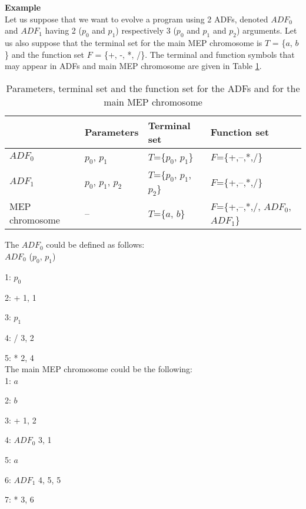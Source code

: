 \documentclass [11pt]{article}
\begin{document}
\textbf{Example}\\

Let us suppose that we want to evolve a program using 2 ADFs, denoted $ADF_0$ and $ADF_1$ having 2 ($p_{0}$ and $p_{1}$) respectively 3 ($p_{0}$ and $p_{1}$ and $p_{2}$) arguments. Let us also suppose that the terminal set for the main MEP chromosome is  $T$ = {\{}$a$, $b${\}} and the function set $F$ = {\{}+, -, *, /{\}}. The terminal and function symbols that may appear in ADFs and main MEP chromosome are given in Table \ref{table:16-5}.


\begin{table}[ht]
\begin{center}
\caption{Parameters, terminal set and the function set for the ADFs and for the main MEP chromosome}
\label{table:16-5}
\begin{tabular}
{p{75pt}p{53pt}p{70pt}p{115pt}}
\hline
& 
\textbf{Parameters}& 
\textbf{Terminal set}& 
\textbf{Function set} \\
\hline
$ADF_0$& 
$p_{0}$, $p_{1}$& 
$T$={\{}$ p_{0}$, $p_{1}${\}}& 
$F$={\{}+,--,*,/{\}} \\
$ADF_1$& 
$p_{0}$, $p_{1}$, $p_{2}$& 
$T$={\{}$p_{0}$, $p_{1}$, $p_{2}${\}}& 
$F$={\{}+,--,*,/{\}} \\
MEP chromosome& 
--& 
$T$={\{}$a$, $b${\}}& 
$F$={\{}+,--,*,/, $ADF_0$, $ADF_1${\}} \\
\hline
\end{tabular}
\end{center}
\end{table}


The $ADF_0$ could be defined as follows:\\

$ADF_0$ ($p_{0}$, $p_{1}$)

1: $p_{0}$

2: + 1, 1

3: $p_{1}$

4: / 3, 2

5: * 2, 4\\


The main MEP chromosome could be the following:\\

1: $a$

2: $b$

3: + 1, 2

4: $ADF_0$ 3, 1

5: $a$

6: $ADF_1$ 4, 5, 5

7: * 3, 6\\
\end{document}
